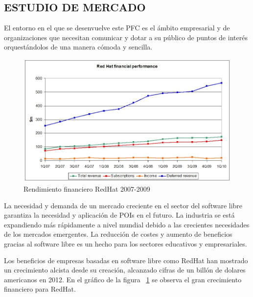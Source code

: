 \subsection{\uppercase{Estudio de mercado}}
\label{sec:marketstudy}

El entorno en el que se desenvuelve este PFC es el ámbito empresarial y de
organizaciones que necesitan comunicar y dotar a su público de puntos de
interés orquestándolos de una manera cómoda y sencilla.~\\

\begin{figure}[ht]
    \begin{center}
        \includegraphics[width=460px]{src/img/redhat-financial-perfomance.jpg}
        \caption[Rendimiento financiero RedHat 2007-2009] {Rendimiento financiero RedHat 2007-2009}
        \label{fig:Redhatrevenues}
    \end{center}
\end{figure}

\newpage

La necesidad y demanda de un mercado creciente en el sector del software
libre\cite{Asl09} garantiza la necesidad y aplicación de POIs en el futuro.
La industria se está expandiendo más rápidamente a nivel mundial debido a 
las crecientes necesidades de los mercados emergentes.
La reducción de costes y aumento de beneficios gracias al software libre es
un hecho para los sectores educativos y empresariales.

Los beneficios de empresas basadas en software libre como RedHat han mostrado un
crecimiento alcista desde su creación, alcanzado cifras de un billón de
dolares americanos en 2012\cite{McM12}. En el gráfico de la figura
~\ref{fig:Redhatrevenues} se observa el gran crecimiento financiero para RedHat.

